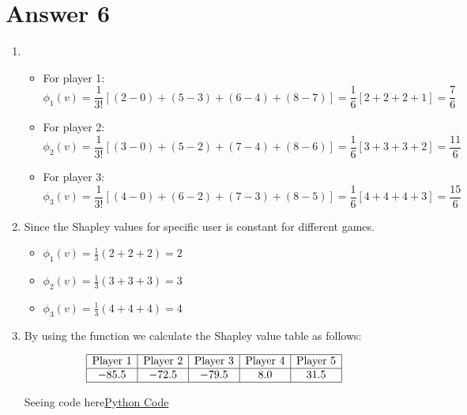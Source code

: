 \documentclass[
	12pt, %
]{fphw}
\begin{document}
\section*{Answer 6}
\begin{enumerate}
\item \begin{itemize}
	\item For player 1:
	\[
	\phi_1(v) = \frac{1}{3!} [(2 - 0) + (5 - 3) + (6 - 4) + (8 - 7)] = \frac{1}{6} [2 + 2 + 2 + 1] = \frac{7}{6}
	\]
	\item For player 2:
	\[
	\phi_2(v) = \frac{1}{3!} [(3 - 0) + (5 - 2) + (7 - 4) + (8 - 6)] = \frac{1}{6} [3 + 3 + 3 + 2] = \frac{11}{6}
	\]
	\item For player 3:
	\[
	\phi_3(v) = \frac{1}{3!} [(4 - 0) + (6 - 2) + (7 - 3) + (8 - 5)] = \frac{1}{6} [4 + 4 + 4 + 3] = \frac{15}{6}
	\]
	\end{itemize}
	\item Since the Shapley values for specific user is constant for different games.
	\begin{itemize}
		\item \(\phi_1(v) = \frac{1}{3}(2 + 2 + 2) = 2\)
		\item \(\phi_2(v) = \frac{1}{3}(3 + 3 + 3) = 3\)
		\item \(\phi_3(v) = \frac{1}{3}(4 + 4 + 4) = 4\)
	\end{itemize}
\item By using the function we calculate the Shapley value table as follows:

\[
\begin{array}{|c|c|c|c|c|}
\hline
\text{Player 1} & \text{Player 2} & \text{Player 3} & \text{Player 4} & \text{Player 5} \\
\hline
-85.5 & -72.5 & -79.5 & 8.0 & 31.5 \\
\hline
\end{array}
\]


Seeing code here\href{q6.py}{Python Code}

\end{enumerate}
\end{document}
